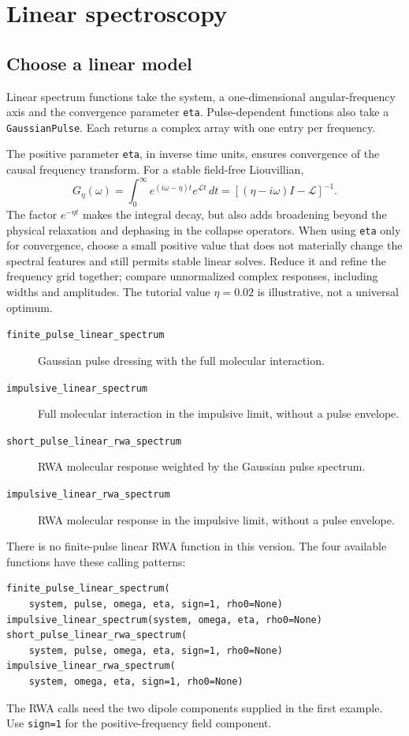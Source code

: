 \section{Linear spectroscopy}
\label{sec:linear}

\subsection{Choose a linear model}

Linear spectrum functions take the system, a one-dimensional angular-frequency
axis and the convergence parameter \texttt{eta}. Pulse-dependent functions
also take a \texttt{GaussianPulse}. Each returns a complex array with one
entry per frequency.


The positive parameter \texttt{eta}, in inverse time units, ensures
convergence of the causal frequency transform. For a stable field-free
Liouvillian,
\[
G_\eta(\omega)=\int_0^\infty
 e^{(i\omega-\eta)t}e^{\mathcal L t}\,dt
 =[(\eta-i\omega)I-\mathcal L]^{-1}.
\]
The factor $e^{-\eta t}$ makes the integral decay, but also adds broadening
beyond the physical relaxation and dephasing in the collapse operators.
When using \texttt{eta} only for convergence, choose a small positive value
that does not materially change the spectral features and still permits
stable linear solves. Reduce it and refine the frequency grid together;
compare unnormalized complex responses, including widths and amplitudes.
The tutorial value $\eta=0.02$ is illustrative, not a universal optimum.

\begin{description}
\item[\texttt{finite\_pulse\_linear\_spectrum}]
Gaussian pulse dressing with the full molecular interaction.
\item[\texttt{impulsive\_linear\_spectrum}]
Full molecular interaction in the impulsive limit, without a pulse envelope.
\item[\texttt{short\_pulse\_linear\_rwa\_spectrum}]
RWA molecular response weighted by the Gaussian pulse spectrum.
\item[\texttt{impulsive\_linear\_rwa\_spectrum}]
RWA molecular response in the impulsive limit, without a pulse envelope.
\end{description}
There is no finite-pulse linear RWA function in this version. The four
available functions have these calling patterns:

\par\noindent
\begin{minipage}{\linewidth}
\begin{lstlisting}[style=python]
finite_pulse_linear_spectrum(
    system, pulse, omega, eta, sign=1, rho0=None)
impulsive_linear_spectrum(system, omega, eta, rho0=None)
short_pulse_linear_rwa_spectrum(
    system, pulse, omega, eta, sign=1, rho0=None)
impulsive_linear_rwa_spectrum(
    system, omega, eta, sign=1, rho0=None)
\end{lstlisting}
\end{minipage}\par
The RWA calls need the two dipole components supplied in the first example.
Use \texttt{sign=1} for the positive-frequency field component.

